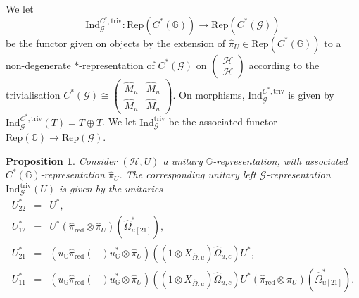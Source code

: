 \documentclass[reqno]{amsart}
\numberwithin{equation}{section}
\newtheorem{Prop}[Theorem]{Proposition}
\newcommand{\Hsp}{\mathcal{H}}
\newcommand{\G}{\mathbb{G}}
\newcommand{\msG}{\mathscr{G}}
\newcommand{\Rep}{\mathrm{Rep}}
\newcommand{\Ind}{\mathrm{Ind}}
\newcommand{\red}{\mathrm{red}}
\newcommand{\triv}{\mathrm{triv}}
\begin{document}
We let
\begin{equation}\label{eq11}
\Ind_{\msG}^{C^*,\triv}\colon \Rep(C^*(\G))\rightarrow \Rep(C^*(\msG))
\end{equation}
be the functor given on objects by the extension of $\hat{\pi}_U\in \Rep(C^*(\G))$ to a non-degenerate $*$-representation of $C^*(\msG)$ on $\begin{pmatrix} \Hsp \\ \Hsp \end{pmatrix}$ according to the trivialisation $C^*(\msG)\cong \begin{pmatrix}
\hat{M}_u & \hat{M}_u\\
\hat{M}_u & \hat{M}_u
\end{pmatrix}$. On morphisms, $\Ind_{\msG}^{C^*,\triv}$ is given by $\Ind_{\msG}^{C^*,\triv}(T)=T\oplus T$. We let $\Ind_{\msG}^{\triv}$ be the associated functor $\Rep(\G)\rightarrow \Rep(\msG)$.

\begin{Prop}\label{PropInducedCorep}
Consider $(\Hsp,U)$ a unitary $\G$-representation, with associated $C^*(\G)$-representation $\hat{\pi}_U$. The corresponding unitary left $\msG$-representation $\Ind_{\msG}^{\triv}(U)$ is given by the unitaries 
\begin{eqnarray}
U_{22}^* &=& U^*,\\
\label{EqU12Form} U_{12}^* &=&  U^*(\hat{\pi}_{\red}\otimes \hat{\pi}_U)(\hat{\Omega}_{u[21]}^*),\\
U_{21}^* &=& (u_{\G}\hat{\pi}_{\red}( - )u_{\G}^*\otimes \hat{\pi}_U)((1\otimes X_{\hat{\Omega},u})\hat{\Omega}_{u,c})U^*,\\
 U_{11}^* &=& (u_{\G}\hat{\pi}_{\red}( - )u_{\G}^*\otimes \hat{\pi}_U)((1\otimes X_{\hat{\Omega},u})\hat{\Omega}_{u,c})U^*(\hat{\pi}_{\red}\otimes \hat{\pi}_U)(\hat{\Omega}_{u[21]}^*).
\end{eqnarray}
\end{Prop} 
\end{document}
